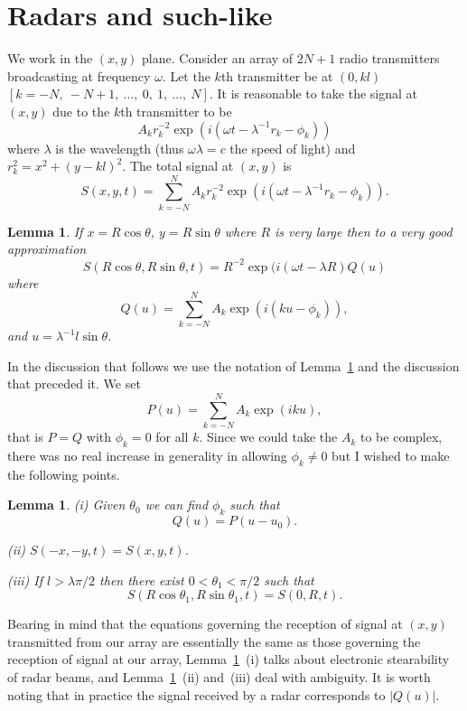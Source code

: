\documentclass[12pt]{article}
\newtheorem{lemma}[theorem]{Lemma}
\theoremstyle{definition}
\begin{document}
\section{Radars and such-like} We work in the $(x,y)$ plane.
Consider an array of $2N+1$ radio transmitters broadcasting
at frequency $\omega$. Let the $k$th transmitter be
at $(0,kl)$ $[k=-N,\ -N+1,\ \dots,\ 0,\ 1,\ \dots,\ N]$.
It is reasonable to take the signal at $(x,y)$
due to the $k$th transmitter to be
\[A_{k}r_{k}^{-2}\exp(i(\omega t-\lambda^{-1}r_{k}-\phi_{k}))\]
where $\lambda$ is the wavelength (thus $\omega\lambda=c$
the speed of light)
and $r_{k}^{2}=x^{2}+(y-kl)^{2}$.
The total signal at $(x,y)$ is
\[S(x,y,t)=\sum_{k=-N}^{N}
A_{k}r_{k}^{-2}\exp(i(\omega t-\lambda^{-1}r_{k}-\phi_{k})).\]
\begin{lemma}\label{Distant beam}
If $x=R\cos\theta$, $y=R\sin\theta$ where
$R$ is very large then to a very good approximation
\[S(R\cos\theta,R\sin\theta,t)=R^{-2}\exp(i(\omega t-\lambda R)Q(u)\]
where
\[Q(u)=\sum_{k=-N}^{N}A_{k}\exp(i(ku-\phi_{k})),\]
and $u=\lambda^{-1}l\sin\theta$.
\end{lemma}
In the discussion that follows we use the notation
of Lemma~\ref{Distant beam} and the discussion that
preceded it. We set
\[P(u)=\sum_{k=-N}^{N}A_{k}\exp(iku),\]
that is $P=Q$ with $\phi_{k}=0$ for all $k$.
Since we could take the $A_{k}$
to be complex, there was no real increase
in generality in allowing $\phi_{k}\neq 0$ but
I wished to make the following points.
\begin{lemma}\label{stearable}
(i) Given $\theta_{0}$ we can find
$\phi_{k}$ such that
\[Q(u)=P(u-u_{0}).\]

(ii) $S(-x,-y,t)=S(x,y,t)$.

(iii) If $l>\lambda\pi/2$ then there exist $0<\theta_{1}<\pi/2$
such that
\[S(R\cos\theta_{1},R\sin\theta_{1},t)=S(0,R,t).\]
\end{lemma}

Bearing in mind that the equations governing the reception
of signal at $(x,y)$ transmitted from our array are
essentially the same as those governing the reception
of signal at  our array, Lemma~\ref{stearable}~(i)
talks about electronic stearability of radar beams,
and Lemma~\ref{stearable}~(ii) and~(iii) deal with
ambiguity. It is worth noting that in practice
the signal received by a radar corresponds to $|Q(u)|$.
\end{document}
